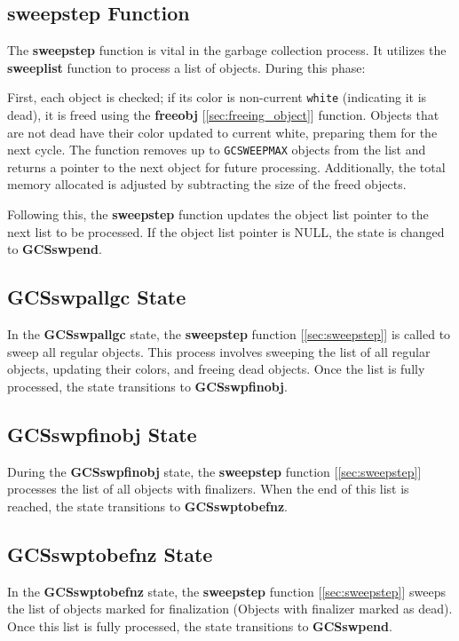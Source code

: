 \documentclass[10pt]{article}
\begin{document}
\subsection*{sweepstep Function} \label{sec:sweepstep}

The \textbf{sweepstep} function is vital in the garbage collection process. It utilizes the \textbf{sweeplist} function to process a list of objects. During this phase:

First, each object is checked; if its color is non-current \texttt{white} (indicating it is dead), it is freed using the \textbf{freeobj} [\ref{sec:freeing_object}] function. Objects that are not dead have their color updated to current white, preparing them for the next cycle. The function removes up to \texttt{GCSWEEPMAX} objects from the list and returns a pointer to the next object for future processing. Additionally, the total memory allocated is adjusted by subtracting the size of the freed objects.


Following this, the \textbf{sweepstep} function updates the object list pointer to the next list to be processed. If the object list pointer is NULL, the state is changed to \textbf{GCSswpend}.

\subsection{GCSswpallgc State}
In the \textbf{GCSswpallgc} state, the \textbf{sweepstep} function [\ref{sec:sweepstep}] is called to sweep all regular objects. This process involves sweeping the list of all regular objects, updating their colors, and freeing dead objects. Once the list is fully processed, the state transitions to \textbf{GCSswpfinobj}.

\subsection{GCSswpfinobj State}
During the \textbf{GCSswpfinobj} state, the \textbf{sweepstep} function [\ref{sec:sweepstep}] processes the list of all objects with finalizers. When the end of this list is reached, the state transitions to \textbf{GCSswptobefnz}.

\subsection{GCSswptobefnz State}
In the \textbf{GCSswptobefnz} state, the \textbf{sweepstep} function [\ref{sec:sweepstep}] sweeps the list of objects marked for finalization (Objects with finalizer marked as dead). Once this list is fully processed, the state transitions to \textbf{GCSswpend}.
\end{document}
